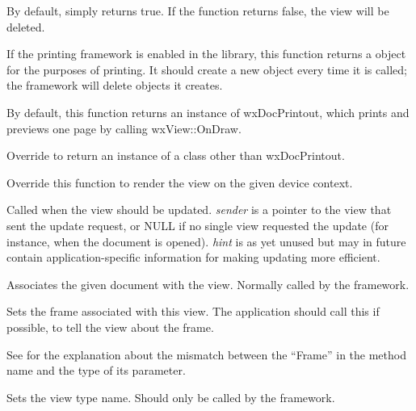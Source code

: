By default, simply returns true. If the function returns false, the
view will be deleted.

\label{wxviewoncreateprintout}


If the printing framework is enabled in the library, this function returns a
\rtfsp{} object for the purposes of printing. It should create a new object
every time it is called; the framework will delete objects it creates.

By default, this function returns an instance of wxDocPrintout, which prints
and previews one page by calling wxView::OnDraw.

Override to return an instance of a class other than wxDocPrintout.

\label{onviewondraw}


Override this function to render the view on the given device context.

\label{onviewonupdate}


Called when the view should be updated. {\it sender} is a pointer to the view
that sent the update request, or NULL if no single view requested the update (for instance,
when the document is opened). {\it hint} is as yet unused but may in future contain
application-specific information for making updating more efficient.

\label{wxviewsetdocument}


Associates the given document with the view. Normally called by the
framework.

\label{wxviewsetframe}


Sets the frame associated with this view. The application should call this
if possible, to tell the view about the frame.

See  for the explanation about the mismatch
between the ``Frame'' in the method name and the type of its parameter.

\label{wxviewsetviewname}


Sets the view type name. Should only be called by the framework.
